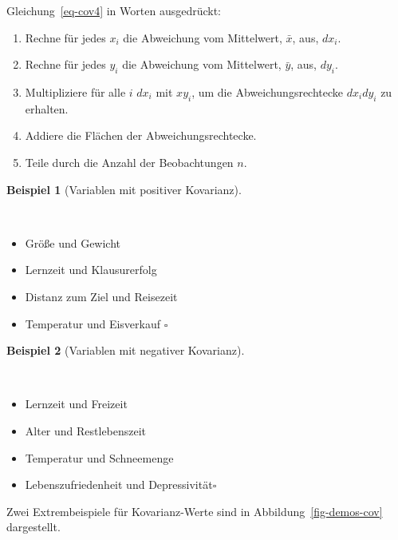 \documentclass[
  letterpaper,
  twoside,
  open=any]{scrbook}
\providecommand{\tightlist}{%
  \setlength{\itemsep}{0pt}\setlength{\parskip}{0pt}}\usepackage{longtable,booktabs,array}
\theoremstyle{definition}
\theoremstyle{definition}
\newtheorem{example}{Beispiel}[chapter]
\theoremstyle{definition}
\theoremstyle{remark}
\begin{document}
Gleichung~\ref{eq-cov4} in Worten ausgedrückt:

\begin{enumerate}
\def\labelenumi{\arabic{enumi}.}
\tightlist
\item
  Rechne für jedes \(x_i\) die Abweichung vom Mittelwert, \(\bar{x}\),
  aus, \(dx_i\).
\item
  Rechne für jedes \(y_i\) die Abweichung vom Mittelwert, \(\bar{y}\),
  aus, \(dy_i\).
\item
  Multipliziere für alle \(i\) \(dx_i\) mit \(xy_i\), um die
  Abweichungsrechtecke \(dx_i dy_i\) zu erhalten.
\item
  Addiere die Flächen der Abweichungsrechtecke.
\item
  Teile durch die Anzahl der Beobachtungen \(n\).
\end{enumerate}

\begin{example}[Variablen mit positiver
Kovarianz]\protect\hypertarget{exm-pos-kov}{}\label{exm-pos-kov}

~

\begin{itemize}
\tightlist
\item
  Größe und Gewicht
\item
  Lernzeit und Klausurerfolg
\item
  Distanz zum Ziel und Reisezeit
\item
  Temperatur und Eisverkauf \(\square\)
\end{itemize}

\end{example}

\begin{example}[Variablen mit negativer
Kovarianz]\protect\hypertarget{exm-neg-kov}{}\label{exm-neg-kov}

~

\begin{itemize}
\tightlist
\item
  Lernzeit und Freizeit
\item
  Alter und Restlebenszeit
\item
  Temperatur und Schneemenge
\item
  Lebenszufriedenheit und Depressivität\(\square\)
\end{itemize}

\end{example}

Zwei Extrembeispiele für Kovarianz-Werte sind in
Abbildung~\ref{fig-demos-cov} dargestellt.
\end{document}
